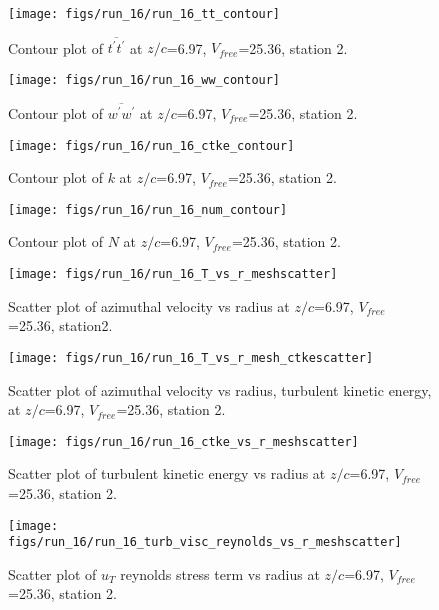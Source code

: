 \begin{figure}[H]
\centering
\texttt{[image: figs/run\_16/run\_16\_tt\_contour]}
\caption{Contour plot of $\overline{t^\prime t^\prime}$ at $z/c$=6.97, $V_{free}$=25.36, station 2.}
\end{figure}


\begin{figure}[H]
\centering
\texttt{[image: figs/run\_16/run\_16\_ww\_contour]}
\caption{Contour plot of $\overline{w^\prime w^\prime}$ at $z/c$=6.97, $V_{free}$=25.36, station 2.}
\end{figure}


\begin{figure}[H]
\centering
\texttt{[image: figs/run\_16/run\_16\_ctke\_contour]}
\caption{Contour plot of $k$ at $z/c$=6.97, $V_{free}$=25.36, station 2.}
\end{figure}


\begin{figure}[H]
\centering
\texttt{[image: figs/run\_16/run\_16\_num\_contour]}
\caption{Contour plot of $N$ at $z/c$=6.97, $V_{free}$=25.36, station 2.}
\end{figure}


\begin{figure}[H]
\centering
\texttt{[image: figs/run\_16/run\_16\_T\_vs\_r\_meshscatter]}
\caption{Scatter plot of azimuthal velocity vs radius at $z/c$=6.97, $V_{free}$=25.36, station2.}
\end{figure}


\begin{figure}[H]
\centering
\texttt{[image: figs/run\_16/run\_16\_T\_vs\_r\_mesh\_ctkescatter]}
\caption{Scatter plot of azimuthal velocity vs radius, turbulent kinetic energy, at $z/c$=6.97, $V_{free}$=25.36, station 2.}
\end{figure}


\begin{figure}[H]
\centering
\texttt{[image: figs/run\_16/run\_16\_ctke\_vs\_r\_meshscatter]}
\caption{Scatter plot of turbulent kinetic energy vs radius at $z/c$=6.97, $V_{free}$=25.36, station 2.}
\end{figure}


\begin{figure}[H]
\centering
\texttt{[image: figs/run\_16/run\_16\_turb\_visc\_reynolds\_vs\_r\_meshscatter]}
\caption{Scatter plot of $
u_T$ reynolds stress term vs radius at $z/c$=6.97, $V_{free}$=25.36, station 2.}
\end{figure}


